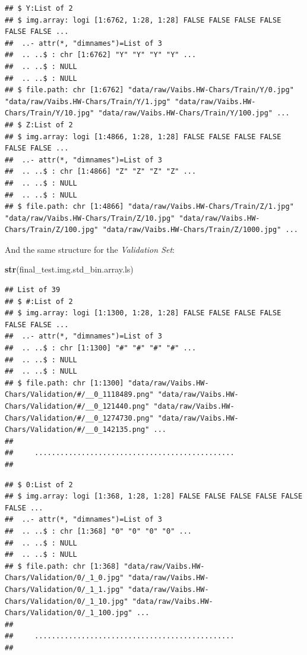 \documentclass[
]{report}
\newenvironment{Shaded}{\begin{snugshade}}{\end{snugshade}}
\newcommand{\FunctionTok}[1]{\textcolor[rgb]{0.13,0.29,0.53}{\textbf{#1}}}
\newcommand{\NormalTok}[1]{#1}
\begin{document}
\normalsize

\footnotesize

\begin{verbatim}
## $ Y:List of 2
## $ img.array: logi [1:6762, 1:28, 1:28] FALSE FALSE FALSE FALSE FALSE FALSE ...
##  ..- attr(*, "dimnames")=List of 3
##  .. ..$ : chr [1:6762] "Y" "Y" "Y" "Y" ...
##  .. ..$ : NULL
##  .. ..$ : NULL
## $ file.path: chr [1:6762] "data/raw/Vaibs.HW-Chars/Train/Y/0.jpg" "data/raw/Vaibs.HW-Chars/Train/Y/1.jpg" "data/raw/Vaibs.HW-Chars/Train/Y/10.jpg" "data/raw/Vaibs.HW-Chars/Train/Y/100.jpg" ...
## $ Z:List of 2
## $ img.array: logi [1:4866, 1:28, 1:28] FALSE FALSE FALSE FALSE FALSE FALSE ...
##  ..- attr(*, "dimnames")=List of 3
##  .. ..$ : chr [1:4866] "Z" "Z" "Z" "Z" ...
##  .. ..$ : NULL
##  .. ..$ : NULL
## $ file.path: chr [1:4866] "data/raw/Vaibs.HW-Chars/Train/Z/1.jpg" "data/raw/Vaibs.HW-Chars/Train/Z/10.jpg" "data/raw/Vaibs.HW-Chars/Train/Z/100.jpg" "data/raw/Vaibs.HW-Chars/Train/Z/1000.jpg" ...
\end{verbatim}

\normalsize

\newpage

And the same structure for the \emph{Validation Set}:

\begin{Shaded}
\begin{Highlighting}[]
\FunctionTok{str}\NormalTok{(final\_test.img.std\_bin.array.ls)}
\end{Highlighting}
\end{Shaded}

\footnotesize

\begin{verbatim}
## List of 39
## $ #:List of 2
## $ img.array: logi [1:1300, 1:28, 1:28] FALSE FALSE FALSE FALSE FALSE FALSE ...
##  ..- attr(*, "dimnames")=List of 3
##  .. ..$ : chr [1:1300] "#" "#" "#" "#" ...
##  .. ..$ : NULL
##  .. ..$ : NULL
## $ file.path: chr [1:1300] "data/raw/Vaibs.HW-Chars/Validation/#/__0_1118489.png" "data/raw/Vaibs.HW-Chars/Validation/#/__0_121440.png" "data/raw/Vaibs.HW-Chars/Validation/#/__0_1274730.png" "data/raw/Vaibs.HW-Chars/Validation/#/__0_142135.png" ...
## 
##     ...............................................
## 
\end{verbatim}

\normalsize

\footnotesize

\begin{verbatim}
## $ 0:List of 2
## $ img.array: logi [1:368, 1:28, 1:28] FALSE FALSE FALSE FALSE FALSE FALSE ...
##  ..- attr(*, "dimnames")=List of 3
##  .. ..$ : chr [1:368] "0" "0" "0" "0" ...
##  .. ..$ : NULL
##  .. ..$ : NULL
## $ file.path: chr [1:368] "data/raw/Vaibs.HW-Chars/Validation/0/_1_0.jpg" "data/raw/Vaibs.HW-Chars/Validation/0/_1_1.jpg" "data/raw/Vaibs.HW-Chars/Validation/0/_1_10.jpg" "data/raw/Vaibs.HW-Chars/Validation/0/_1_100.jpg" ...
## 
##     ...............................................
## 
\end{verbatim}
\end{document}

